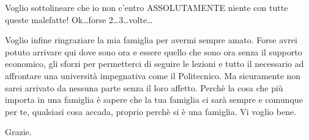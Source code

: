 Voglio sottolineare che io non c'entro ASSOLUTAMENTE niente con tutte queste malefatte! Ok\dots forse 2\dots 3\dots volte\dots

Voglio infine ringraziare la mia famiglia per avermi sempre amato. Forse avrei potuto arrivare qui dove sono ora e essere quello che sono ora senza il supporto economico, gli sforzi per permetterci di seguire le lezioni e tutto il necessario ad affrontare una università impegnativa come il Politecnico. Ma sicuramente non sarei arrivato da nessuna parte senza il loro affetto. Perchè la cosa che più importa in una famiglia è sapere che la tua famiglia ci sarà sempre e comunque per te, qualsiasi cosa accada, proprio perchè si è una famiglia. Vi voglio bene.

Grazie.

